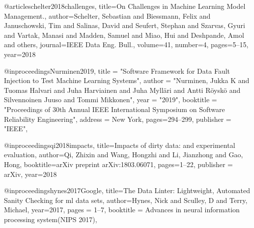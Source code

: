 


@article{schelter2018challenges,
  title={On Challenges in Machine Learning Model Management.},
  author={Schelter, Sebastian and Biessmann, Felix and Januschowski, Tim and Salinas, David and Seufert, Stephan and Szarvas, Gyuri and Vartak, Manasi and Madden, Samuel and Miao, Hui and Deshpande, Amol and others},
  journal={IEEE Data Eng. Bull.},
  volume={41},
  number={4},
  pages={5--15},
  year={2018}
}

@inproceedings{Nurminen2019,
title = "Software Framework for Data Fault Injection to Test Machine Learning Systems",
author = "Nurminen, {Jukka K} and Tuomas Halvari and Juha Harviainen and Juha Myll{\"a}ri and Antti R{\"o}ysk{\"o} and Silvennoinen Juuso and Tommi Mikkonen",
year = "2019",
booktitle = "Proceedings of 30th Annual IEEE International Symposium on Software Reliability Engineering",
address = {New York},
pages={294--299},
publisher = "IEEE",
}

@inproceedings{qi2018impacts,
  title={Impacts of dirty data: and experimental evaluation},
  author={Qi, Zhixin and Wang, Hongzhi and Li, Jianzhong and Gao, Hong},
  booktitle={arXiv preprint arXiv:1803.06071},
  pages={1--22},
  publisher = {arXiv},
  year={2018}
}

@inproceedings{hynes2017Google,
  title={The Data Linter: Lightweight, Automated Sanity Checking for ml data sets},
  author={Hynes, Nick and Sculley, D and Terry, Michael},
 year={2017},
 pages = {1--7},
  booktitle = {Advances in neural information processing system(NIPS 2017)},
}

